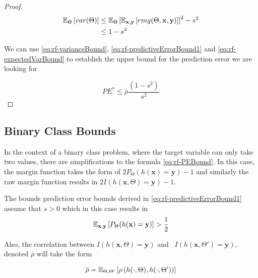 \begin{proof}
    \begin{equation}\label{eq:rf-expectedVarBound}
    \begin{split}
    \operatorname{\mathbb{E}}_{\Theta} \left[ var(\Theta) \right] & \leq \operatorname{\mathbb{E}}_{\Theta} {\left[ \operatorname{\mathbb{E}}_{\textbf{x},\textbf{y}}\left[ rmg(\Theta,\textbf{x},\textbf{y})  \right] \right]}^2 -s^2 \\
    & \leq 1-s^2
    \end{split}
    \end{equation}



    We can use \cref{eq:rf-varianceBound}, \cref{eq:rf-predictiveErrorBound1} and \cref{eq:rf-expectedVarBound} to establish the upper bound for the prediction error we are looking for

    \begin{equation}
    PE^* \leq \overline{\rho}\frac{(1-s^2)}{s^2}
    \end{equation}

\end{proof}

\subsection{Binary Class Bounds}\label{appx:subsec:random_forests_binary_class}

In the context of a binary class problem, where the target variable can only take two values, there are simplifications to the formula \cref{eq:rf-PEBound}.
In this case, the margin function takes the form of $2 P_{\Theta}(h(\textbf{x}) = \textbf{y}) -1$ and similarly the raw margin function results in $2 I(h(\textbf{x}, \Theta) = \textbf{y}) -1$.


The bounds prediction error bounds derived in \cref{eq:rf-predictiveErrorBound1} assume that $s >0$ which in this case results in
\begin{equation}
\operatorname{\mathbb{E}}_{\textbf{x},\textbf{y}} \left[ P_{\Theta}(h(\textbf{x}) = \textbf{y}) \right] > \frac{1}{2}
\end{equation}


Also, the correlation between $I(h(\textbf{x}, \Theta) = \textbf{y})$ and \ $I(h(\textbf{x}, \Theta') = \textbf{y})$, denoted $\overline{\rho}$ will take the form

\begin{equation}
\overline{\rho} = \operatorname{\mathbb{E}}_{\Theta,\Theta'} \left[ \rho \left( h(\cdot{},\Theta) ,h(\cdot{},\Theta') \right)  \right]
\end{equation}





